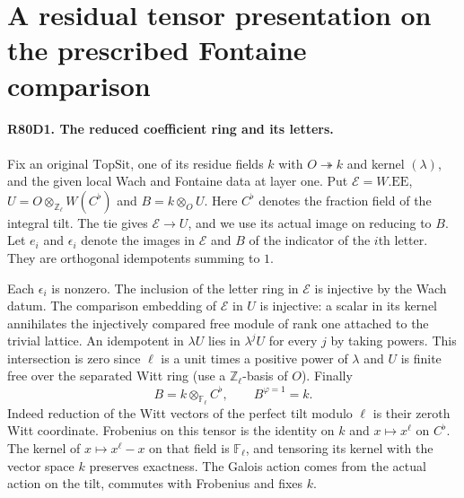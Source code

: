 \section{A residual tensor presentation on the prescribed Fontaine comparison}

\paragraph{R80D1. The reduced coefficient ring and its letters.}
Fix an original $\mathrm{TopSit}$, one of its residue fields
$k$ with $O\twoheadrightarrow k$ and kernel $(\lambda)$, and
the given local Wach and Fontaine data at layer one. Put
$\mathcal E=W.\mathrm{EE}$, $U=O\otimes_{\mathbb Z_\ell}
W(C^\flat)$ and $B=k\otimes_O U$. Here $C^\flat$ denotes the
fraction field of the integral tilt. The tie gives
$\mathcal E\longrightarrow U$, and we use its actual image on
reducing to $B$. Let $e_i$ and $\epsilon_i$ denote the images
in $\mathcal E$ and $B$ of the indicator of the $i$th letter.
They are orthogonal idempotents summing to $1$.

Each $\epsilon_i$ is nonzero. The inclusion of the letter ring
in $\mathcal E$ is injective by the Wach datum. The comparison
embedding of $\mathcal E$ in $U$ is injective: a scalar in its
kernel annihilates the injectively compared free module of rank
one attached to the trivial lattice. An idempotent in $\lambda U$
lies in $\lambda^jU$ for every $j$ by taking powers. This
intersection is zero since $\ell$ is a unit times a positive
power of $\lambda$ and $U$ is finite free over the separated
Witt ring (use a $\mathbb Z_\ell$-basis of $O$). Finally
\[
 B=k\otimes_{\mathbb F_\ell} C^\flat,\qquad B^{\varphi=1}=k .
\]
Indeed reduction of the Witt vectors of the perfect tilt modulo
$\ell$ is their zeroth Witt coordinate. Frobenius on this tensor
is the identity on $k$ and $x\mapsto x^\ell$ on $C^\flat$.
The kernel of $x\mapsto x^\ell-x$ on that field is
$\mathbb F_\ell$, and tensoring its kernel with the vector space
$k$ preserves exactness. The Galois action comes from the actual
action on the tilt, commutes with Frobenius and fixes $k$.

